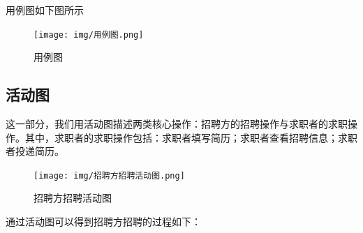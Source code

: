 \documentclass[UTF8,a4paper,10pt]{ctexart}
\begin{document}
用例图如下图所示
\begin{figure}[H]
    \centering
    \texttt{[image: img/用例图.png]}
    \caption{用例图}
    \label{fig:用例图}
\end{figure}

\subsection{活动图}

这一部分，我们用活动图描述两类核心操作：招聘方的招聘操作与求职者的求职操作。其中，求职者的求职操作包括：求职者填写简历；求职者查看招聘信息；求职者投递简历。

\begin{figure}[H]
    \centering
    \texttt{[image: img/招聘方招聘活动图.png]}
    \caption{招聘方招聘活动图}
    \label{fig:招聘方招聘活动图}
\end{figure}

通过活动图可以得到招聘方招聘的过程如下：
\end{document}
